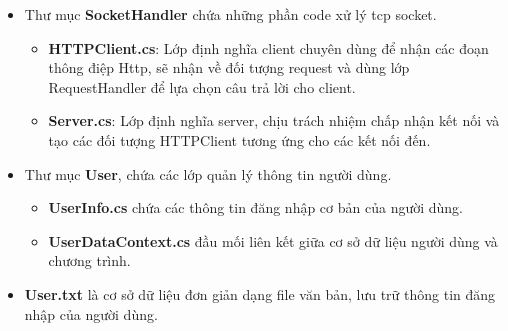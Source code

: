 \documentclass[14pt, a4paper]{extarticle}
\begin{document}
\begin{itemize}
    \item Thư mục \textbf{SocketHandler} chứa những phần code xử lý tcp socket.
    \begin{itemize}
        \item \textbf{HTTPClient.cs}: Lớp định nghĩa client chuyên dùng để nhận các đoạn thông điệp Http, sẽ nhận về đối tượng request và dùng lớp RequestHandler để lựa chọn câu trả lời cho client.
        \item \textbf{Server.cs}: Lớp định nghĩa server, chịu trách nhiệm chấp nhận kết nối và tạo các đối tượng HTTPClient tương ứng cho các kết nối đến.
    \end{itemize}
    \item Thư mục \textbf{User}, chứa các lớp quản lý thông tin người dùng.
    \begin{itemize}
        \item \textbf{UserInfo.cs} chứa các thông tin đăng nhập cơ bản của người dùng.
        \item \textbf{UserDataContext.cs} đầu mối liên kết giữa cơ sở dữ liệu người dùng và chương trình. 
    \end{itemize}
    \item \textbf{User.txt} là cơ sở dữ liệu đơn giản dạng file văn bản, lưu trữ thông tin đăng nhập của người dùng.
\end{itemize}

\newpage
\end{document}

